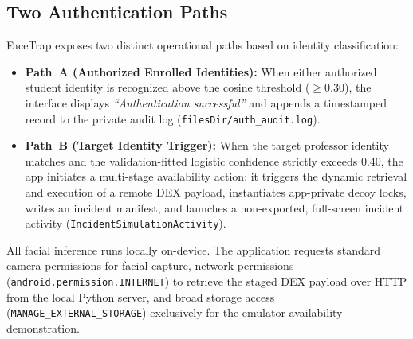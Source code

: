 \documentclass{article}
\begin{document}
\subsection{Two Authentication Paths}
FaceTrap exposes two distinct operational paths based on identity classification:
\begin{itemize}
    \item \textbf{Path~A (Authorized Enrolled Identities):} When either authorized student identity is recognized above the cosine threshold ($\ge 0.30$), the interface displays \textit{``Authentication successful''} and appends a timestamped record to the private audit log (\texttt{filesDir/auth\_audit.log}).
    \item \textbf{Path~B (Target Identity Trigger):} When the target professor identity matches and the validation-fitted logistic confidence strictly exceeds $0.40$, the app initiates a multi-stage availability action: it triggers the dynamic retrieval and execution of a remote DEX payload, instantiates app-private decoy locks, writes an incident manifest, and launches a non-exported, full-screen incident activity (\texttt{IncidentSimulationActivity}).
\end{itemize}
All facial inference runs locally on-device. The application requests standard camera permissions for facial capture, network permissions (\texttt{android.permission.INTERNET}) to retrieve the staged DEX payload over HTTP from the local Python server, and broad storage access (\texttt{MANAGE\_EXTERNAL\_STORAGE}) exclusively for the emulator availability demonstration.
\end{document}
